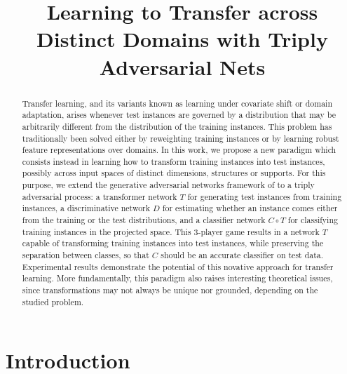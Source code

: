 \documentclass[aoas,preprint,authoryear]{imsart}
\begin{document}
\begin{frontmatter}
\title{Learning to Transfer across Distinct Domains with Triply Adversarial Nets}


\author{ }

\begin{abstract}

Transfer learning, and its variants known as learning under covariate shift or
domain adaptation, arises whenever test instances are governed by a distribution
that may be arbitrarily different from the distribution of the training
instances. This problem has traditionally been solved either by reweighting
training instances or by learning robust feature representations over domains.
In this work, we propose a new paradigm which consists instead in learning how
to transform training instances into test instances, possibly across input
spaces of distinct dimensions, structures or supports. For this purpose, we
extend the generative adversarial networks framework of
\cite{goodfellow2014generative} to a triply adversarial process: a transformer
network $T$ for generating test instances from training instances, a
discriminative network $D$ for estimating whether an instance comes either from
the training or the test distributions, and a classifier network $C \circ T$ for
classifying training instances in the projected space. This 3-player game
results in a network $T$ capable of transforming training instances into test
instances, while preserving the separation between classes, so that $C$ should
be an accurate classifier on test data. Experimental results demonstrate the
potential of this novative approach for transfer learning. More fundamentally,
this paradigm also raises interesting theoretical issues, since transformations
may not always be unique nor grounded, depending on the studied problem.


\end{abstract}

\end{frontmatter}

\section{Introduction}
\end{document}
